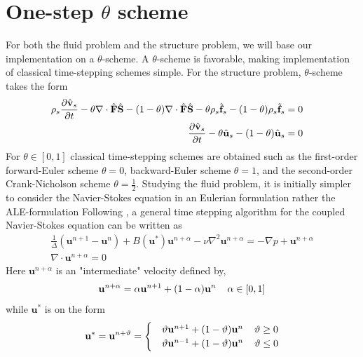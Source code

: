 \section{One-step $\theta$ scheme} 
\label{sec:theta}
For both the fluid problem and the structure problem, we will base our implementation on a $\theta$-scheme. A $\theta$-scheme is favorable, making implementation of classical time-stepping schemes simple. For the structure problem, $\theta$-scheme takes the form
\begin{align*}
\rho_s \frac{\partial \hat{\mathbf{v}}_s}{\partial t} 
- \theta \nabla \cdot \hat{\mathbf{F}}\hat{\mathbf{S}}   - (1 - \theta) \nabla \cdot \hat{\mathbf{F}}\hat{\mathbf{S}}  
- \theta \rho_s \hat{\mathbf{f}}_s 
- (1 - \theta) \rho_s \hat{\mathbf{f}}_s = 0 \\
\frac{\partial \hat{\mathbf{v}}_s}{\partial t} - \theta \hat{\mathbf{u}}_s - (1 - \theta)\hat{\mathbf{u}}_s  = 0&\\
\end{align*} 
For $\theta \in [0, 1]$ classical time-stepping schemes are obtained such as the first-order forward-Euler scheme $\theta = 0$, backward-Euler scheme $\theta = 1$, and the second-order Crank-Nicholson scheme $\theta = \frac{1}{2}$. Studying the fluid problem, it is initially simpler to consider the Navier-Stokes equation in an Eulerian formulation rather the ALE-formulation Following \cite{Simo1994}, a general time stepping algorithm for the coupled Navier-Stokes equation can be written as
\begin{align*}
\frac{1}{\Delta}(\mathbf{u}^{n+1} - \mathbf{u}^{n}) + 
B(\mathbf{u}^{*})\mathbf{u}^{n+\alpha}
- \nu \nabla^2 \mathbf{u}^{n + \alpha} = - \nabla p + \mathbf{u}^{n+\alpha} \\
\nabla \cdot \mathbf{u}^{n+\alpha} = 0 
\end{align*} 
Here $\mathbf{u}^{n+\alpha}$ is an "intermediate" velocity defined by,
\begin{align*}
\mathbf{u}^{n+\alpha} = \alpha\mathbf{u}^{n+1} + (1 - \alpha)\mathbf{u}^{n} 
\hspace{4mm} \alpha \in [0, 1]
\end{align*}
while $\mathbf{u}^{*}$ is on the form
\begin{align*}
\mathbf{u}^{*} =   \mathbf{u}^{n+ \vartheta} =
\begin{cases} 
   &\vartheta \mathbf{u}^{n+1} + (1 - \vartheta)\mathbf{u}^{n} \hspace{4mm} \vartheta \geq 0 \\ 
   &\vartheta \mathbf{u}^{n-1} + (1 - \vartheta)\mathbf{u}^{n} \hspace{4mm} \vartheta \leq 0
   \end{cases}
\end{align*}
